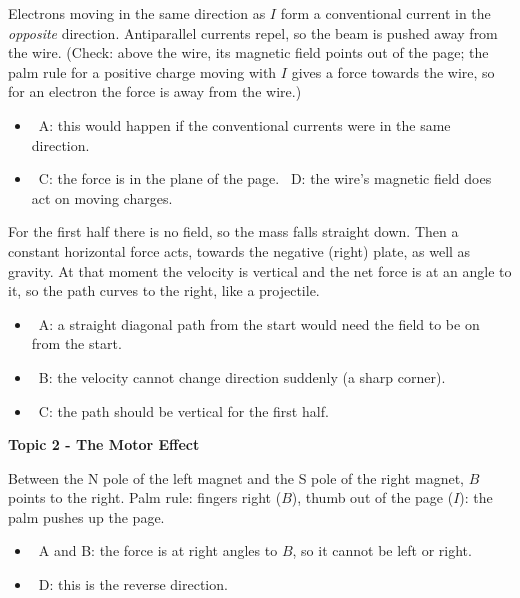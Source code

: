 \documentclass[12pt]{article}
\newcommand\anstopic[1]{\par\Needspace{8\baselineskip}\vspace{4mm}%
  \begin{center}{\headfont\bfseries\fontsize{14}{18}\selectfont #1\par}\end{center}\vspace{2pt}}
\begin{document}
\begin{practiceanswers}
\begin{practiceans}
  Electrons moving in the same direction as $I$ form a conventional current in the \emph{opposite}
  direction. Antiparallel currents repel, so the beam is pushed away from the wire. (Check: above the
  wire, its magnetic field points out of the page; the palm rule for a positive charge moving with $I$
  gives a force towards the wire, so for an electron the force is away from the wire.)
  \begin{itemize}
    \item \xmark\ A: this would happen if the conventional currents were in the same direction.
    \item \xmark\ C: the force is in the plane of the page. \quad \xmark\ D: the wire's magnetic
          field does act on moving charges.
  \end{itemize}
\end{practiceans}

\begin{practiceans}
  For the first half there is no field, so the mass falls straight down. Then a constant horizontal
  force acts, towards the negative (right) plate, as well as gravity. At that moment the velocity is
  vertical and the net force is at an angle to it, so the path curves to the right, like a projectile.
  \begin{itemize}
    \item \xmark\ A: a straight diagonal path from the start would need the field to be on from the start.
    \item \xmark\ B: the velocity cannot change direction suddenly (a sharp corner).
    \item \xmark\ C: the path should be vertical for the first half.
  \end{itemize}
\end{practiceans}

\anstopic{Topic 2 - The Motor Effect}

\begin{practiceans}
  Between the N pole of the left magnet and the S pole of the right magnet, $B$ points to the right.
  Palm rule: fingers right ($B$), thumb out of the page ($I$): the palm pushes up the page.
  \begin{itemize}
    \item \xmark\ A and B: the force is at right angles to $B$, so it cannot be left or right.
    \item \xmark\ D: this is the reverse direction.
  \end{itemize}
\end{practiceans}


\end{practiceanswers}
\end{document}
